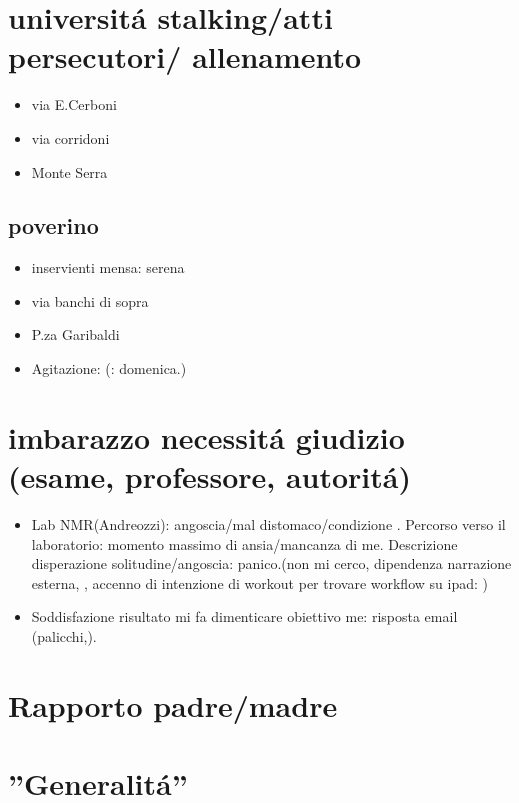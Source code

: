\section{universit\'a stalking/atti persecutori/ allenamento}

\begin{itemize}
\item via E.Cerboni
\item via corridoni
\item Monte Serra
\end{itemize}

\subsection{poverino}

\begin{itemize}
\item inservienti mensa: serena
\item via banchi di sopra
\item P.za Garibaldi
\item Agitazione: (: domenica.)
\end{itemize}


\section{imbarazzo necessit\'a giudizio (esame, professore, autorit\'a)}

\begin{itemize}
\item Lab NMR(Andreozzi): angoscia/mal distomaco/condizione . Percorso verso il laboratorio: momento massimo di ansia/mancanza di me. Descrizione disperazione solitudine/angoscia: panico.(non mi cerco, dipendenza narrazione esterna, , accenno di intenzione di workout per trovare workflow su ipad: )
\item Soddisfazione risultato mi fa dimenticare obiettivo me: risposta email (palicchi,).
\end{itemize}

\section{Rapporto padre/madre}

\section{''Generalit\'a''}
